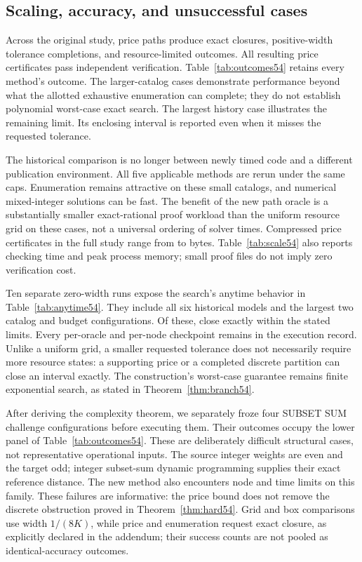 \subsection{Scaling, accuracy, and unsuccessful cases}
Across the original study, price paths produce \PriceExact{} exact closures, \PriceTolerance{} positive-width tolerance completions, and \PriceLimited{} resource-limited outcomes. All \PriceChecked{} resulting price certificates pass independent verification. Table~\ref{tab:outcomes54} retains every method's outcome. The larger-catalog cases demonstrate performance beyond what the allotted exhaustive enumeration can complete; they do not establish polynomial worst-case exact search. The largest history case illustrates the remaining limit. Its enclosing interval is reported even when it misses the requested tolerance.

The historical comparison is no longer between newly timed code and a different publication environment. All five applicable methods are rerun under the same caps. Enumeration remains attractive on these small catalogs, and numerical mixed-integer solutions can be fast. The benefit of the new path oracle is a substantially smaller exact-rational proof workload than the uniform resource grid on these cases, not a universal ordering of solver times. Compressed price certificates in the full study range from \PriceMinBytes{} to \PriceMaxBytes{} bytes. Table~\ref{tab:scale54} also reports checking time and peak process memory; small proof files do not imply zero verification cost.

Ten separate zero-width runs expose the search's anytime behavior in Table~\ref{tab:anytime54}. They include all six historical models and the largest two catalog and budget configurations. Of these, \AnytimeExact{} close exactly within the stated limits. Every per-oracle and per-node checkpoint remains in the execution record. Unlike a uniform grid, a smaller requested tolerance does not necessarily require more resource states: a supporting price or a completed discrete partition can close an interval exactly. The construction's worst-case guarantee remains finite exponential search, as stated in Theorem~\ref{thm:branch54}.

After deriving the complexity theorem, we separately froze four SUBSET SUM challenge configurations before executing them. Their outcomes occupy the lower panel of Table~\ref{tab:outcomes54}. These are deliberately difficult structural cases, not representative operational inputs. The source integer weights are even and the target odd; integer subset-sum dynamic programming supplies their exact reference distance. The new method also encounters node and time limits on this family. These failures are informative: the price bound does not remove the discrete obstruction proved in Theorem~\ref{thm:hard54}. Grid and box comparisons use width $1/(8K)$, while price and enumeration request exact closure, as explicitly declared in the addendum; their success counts are not pooled as identical-accuracy outcomes.

